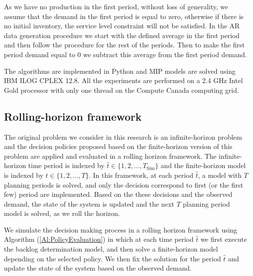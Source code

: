 \documentclass[10pt]{article}
\newcommand{\ti}{t} %
\newcommand{\Ti}{T}
\newcommand{\ka}{k} %
\newcommand{\Bi}{B} %
\newcommand{\Vi}{v} %
\newcommand{\tAct}{\hat{\ti}} %
\begin{document}
{As we have no production in the first period, without loss of generality, we assume that the demand in the first period is equal to zero, otherwise if there is no initial inventory, the service level constraint will not be satisfied. In the AR data generation procedure we start with the defined average in the first period and then follow the procedure for the rest of the periods. Then to make the first period demand equal to 0 we subtract this average from the first period demand.} 

The algorithms are implemented in Python and MIP models are solved using IBM ILOG CPLEX 12.8. All the experiments are performed on a 2.4 GHz Intel Gold processor with only one thread on the Compute Canada computing grid.











\subsection{Rolling-horizon framework}
\label{Sec:Rolling}

The original problem we consider in this research is an infinite-horizon problem and the decision policies proposed based on the finite-horizon version of this problem are applied and evaluated in a rolling horizon framework. The infinite-horizon time period is indexed by $\tAct \in \{1, 2, ... , \Ti_\text{Sim}\}$ and the finite-horizon model is indexed by $\ti \in \{1, 2, ... , \Ti\}$. In this framework, at each period $\tAct$, a model with $\Ti$ planning periods is solved, and only the decision correspond to first (or the first few) period are implemented. Based on the these decisions and the observed demand, the state of the system is updated and the next $\Ti$ planning period model is solved, as we roll the horizon. 

We simulate the decision making process in a rolling horizon framework using Algorithm (\ref{Al:PolicyEvaluation}) in which at each time period $\tAct$ we first execute the backlog determination model, and then solve a finite-horizon model  depending on the  selected policy. We then fix the solution for the period $\tAct$ and update the state of the system based on the observed demand.
\end{document}
